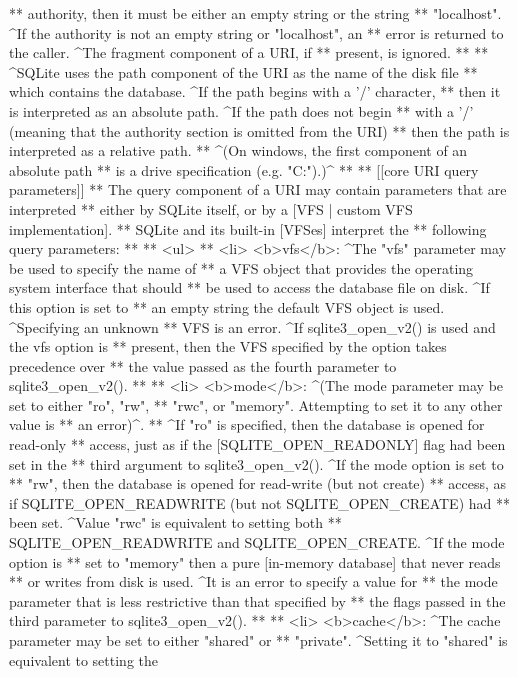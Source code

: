 \begin{Codex}[label=sqlite3.h,numbers=left]
{** authority, then it must be either an empty string or the string 
** "localhost". ^If the authority is not an empty string or "localhost", an 
** error is returned to the caller. ^The fragment component of a URI, if 
** present, is ignored.
**
** ^SQLite uses the path component of the URI as the name of the disk file
** which contains the database. ^If the path begins with a '/' character, 
** then it is interpreted as an absolute path. ^If the path does not begin 
** with a '/' (meaning that the authority section is omitted from the URI)
** then the path is interpreted as a relative path. 
** ^(On windows, the first component of an absolute path 
** is a drive specification (e.g. "C:").)^
**
** [[core URI query parameters]]
** The query component of a URI may contain parameters that are interpreted
** either by SQLite itself, or by a [VFS | custom VFS implementation].
** SQLite and its built-in [VFSes] interpret the
** following query parameters:
**
** <ul>
**   <li> <b>vfs</b>: ^The "vfs" parameter may be used to specify the name of
**     a VFS object that provides the operating system interface that should
**     be used to access the database file on disk. ^If this option is set to
**     an empty string the default VFS object is used. ^Specifying an unknown
**     VFS is an error. ^If sqlite3_open_v2() is used and the vfs option is
**     present, then the VFS specified by the option takes precedence over
**     the value passed as the fourth parameter to sqlite3_open_v2().
**
**   <li> <b>mode</b>: ^(The mode parameter may be set to either "ro", "rw",
**     "rwc", or "memory". Attempting to set it to any other value is
**     an error)^. 
**     ^If "ro" is specified, then the database is opened for read-only 
**     access, just as if the [SQLITE_OPEN_READONLY] flag had been set in the 
**     third argument to sqlite3_open_v2(). ^If the mode option is set to 
**     "rw", then the database is opened for read-write (but not create) 
**     access, as if SQLITE_OPEN_READWRITE (but not SQLITE_OPEN_CREATE) had 
**     been set. ^Value "rwc" is equivalent to setting both 
**     SQLITE_OPEN_READWRITE and SQLITE_OPEN_CREATE.  ^If the mode option is
**     set to "memory" then a pure [in-memory database] that never reads
**     or writes from disk is used. ^It is an error to specify a value for
**     the mode parameter that is less restrictive than that specified by
**     the flags passed in the third parameter to sqlite3_open_v2().
**
**   <li> <b>cache</b>: ^The cache parameter may be set to either "shared" or
**     "private". ^Setting it to "shared" is equivalent to setting the
}
\end{Codex}
